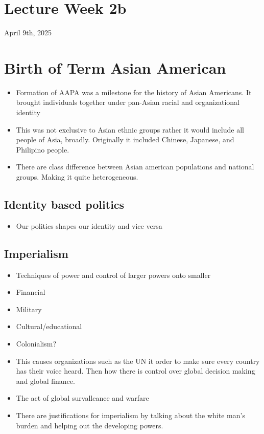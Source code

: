 \documentclass{article}
\begin{document}
\pagebreak

\section*{Lecture Week 2b}
April 9th, 2025

\section{Birth of Term Asian American}
\begin{itemize}
  \item Formation of AAPA was a milestone for the history of Asian Americans. It 
    brought individuals together under pan-Asian racial and organizational identity
  \item This was not exclusive to Asian ethnic groups
    rather it would include all people of Asia, broadly.
    Originally it included Chinese, Japanese, and Philipino people.
  \item There are class difference between Asian american populations and 
    national groups. Making it quite heterogeneous.
\end{itemize}

\subsection{Identity based politics}
\begin{itemize}
  \item Our politics shapes our identity and vice versa
\end{itemize}

\subsection{Imperialism}
\begin{itemize}
  \item Techniques of power and control of larger powers  
    onto smaller
  \item Financial
  \item Military
  \item Cultural/educational
  \item Colonialism?
  \item This causes organizations such as the UN it order to make sure every
    country has their voice heard.
    Then how there is control over global decision making
    and global finance.
  \item The act of global survalleance and warfare
  \item There are justifications for imperialism by
    talking about the white man's burden
    and helping out the developing powers.
\end{itemize}
\end{document}
